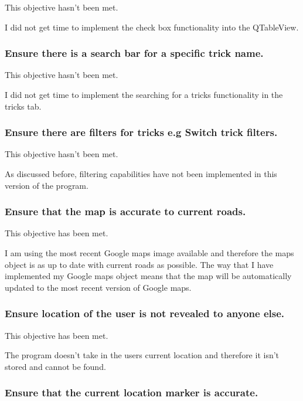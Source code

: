 This objective hasn't been met.

I did not get time to implement the check box functionality into the QTableView.

\subsubsection {Ensure there is a search bar for a specific trick name.}

This objective hasn't been met.

I did not get time to implement the searching for a tricks functionality in the tricks tab.

\subsubsection {Ensure there are filters for tricks e.g Switch trick filters.}

This objective hasn't been met.

As discussed before, filtering capabilities have not been implemented in this version of the program.




\subsubsection {Ensure that the map is accurate to current roads.}

This objective has been met.

I am using the most recent Google maps image available and therefore the maps object is as up to date with current roads as possible. The way that I have implemented my Google maps object means that the map will be automatically updated to the most recent version of Google maps.

\subsubsection {Ensure location of the user is not revealed to anyone else.}

This objective has been met.

The program doesn't take in the users current location and therefore it isn't stored and cannot be found.

\subsubsection {Ensure that the current location marker is accurate.}

